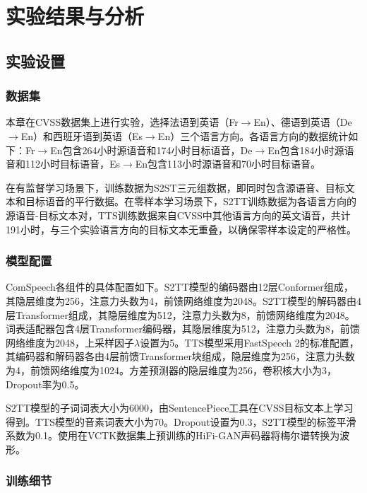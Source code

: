 \section{实验结果与分析}

\subsection{实验设置}

\subsubsection{数据集}

本章在CVSS\citep{jia2022cvss}数据集上进行实验，选择法语到英语（Fr$\rightarrow$En）、德语到英语（De$\rightarrow$En）和西班牙语到英语（Es$\rightarrow$En）三个语言方向。各语言方向的数据统计如下：Fr$\rightarrow$En包含264小时源语音和174小时目标语音，De$\rightarrow$En包含184小时源语音和112小时目标语音，Es$\rightarrow$En包含113小时源语音和70小时目标语音。

在有监督学习场景下，训练数据为S2ST三元组数据，即同时包含源语音、目标文本和目标语音的平行数据。在零样本学习场景下，S2TT训练数据为各语言方向的源语音-目标文本对，TTS训练数据来自CVSS中其他语言方向的英文语音，共计191小时，与三个实验语言方向的目标文本无重叠，以确保零样本设定的严格性。

\subsubsection{模型配置}

ComSpeech各组件的具体配置如下。S2TT模型的编码器由12层Conformer组成，其隐层维度为256，注意力头数为4，前馈网络维度为2048。S2TT模型的解码器由4层Transformer组成，其隐层维度为512，注意力头数为8，前馈网络维度为2048。词表适配器包含4层Transformer编码器，其隐层维度为512，注意力头数为8，前馈网络维度为2048，上采样因子$\lambda$设置为5。TTS模型采用FastSpeech 2的标准配置，其编码器和解码器各由4层前馈Transformer块组成，隐层维度为256，注意力头数为4，前馈网络维度为1024。方差预测器的隐层维度为256，卷积核大小为3，Dropout率为0.5。

S2TT模型的子词词表大小为6000，由SentencePiece工具在CVSS目标文本上学习得到。TTS模型的音素词表大小为70。Dropout设置为0.3，S2TT模型的标签平滑系数为0.1。使用在VCTK数据集\citep{Veaux2017CSTRVC}上预训练的HiFi-GAN\citep{hifigan}声码器将梅尔谱转换为波形。

\subsubsection{训练细节}


